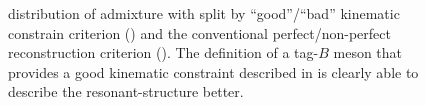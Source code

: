 \begin{figure}[htbp!]
    \centering
    \caption{\label{fig:good_tag_definitions} \Mbc distribution of \BtoXsgamma admixture with split by ``good''/``bad'' kinematic constrain criterion ()
    and the conventional perfect/non-perfect reconstruction criterion ().
    The definition of a tag-$B$ meson that provides a good kinematic constraint described in  is clearly able to describe the resonant-\Mbc structure better.
    }
\end{figure}